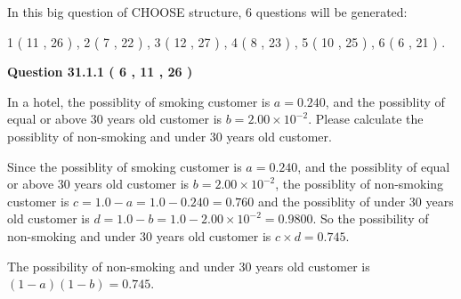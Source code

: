 \documentclass[12pt]{article}
\begin{document}
   
\vspace{0.2in}
   
 In this big question of CHOOSE structure,            6  questions will be generated: 
  
  
             1 (          11 ,          26 )
 ,
             2 (           7 ,          22 )
 ,
             3 (          12 ,          27 )
 ,
             4 (           8 ,          23 )
 ,
             5 (          10 ,          25 )
 ,
             6 (           6 ,          21 )
 .
  
\vspace{0.2in}
  
{\textbf{\Large{Question
31.1.1 
 (           6 ,          11 ,          26 )
}}}
  
  
In a hotel, the possiblity of  %
smoking customer is
$a =  %
0.240$, and the possiblity of  %
equal or above 30 years old customer is $ b =  %
2.00 \times 10^{-2}$.
Please calculate the possiblity of  %
 non-smoking and  %
under 30 years old customer.
 
 
 
\noindent{}
 
 

Since the possiblity of  %
smoking customer is $ a =  %
0.240 $,
and the possiblity of  %
equal or above 30 years old customer is $ b =  %
2.00 \times 10^{-2} $,
the possiblity of  %
non-smoking customer is $ c = 1.0 - a = 1.0 -
0.240
=  %
0.760 $ and the possiblity of  %
under 30 years old
customer is $ d = 1.0 - b = 1.0 -  %
2.00 \times 10^{-2} =  %
0.9800  $.
So the possibility of  %
 non-smoking and  %
under 30 years old
customer is $ c \times d =  %
0.745 $.
 
 
 
\noindent{}
 
 

 
 
 
\noindent{}
 
 

The possibility of  %
 non-smoking and  %
under 30 years old
customer is $ (1-a)(1-b) =  %
0.745 $.
 
 
\noindent{}
 
 
\end{document}
